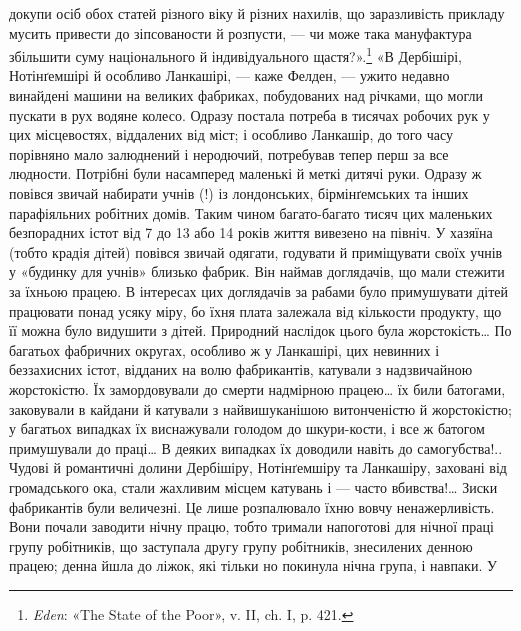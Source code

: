 \parcont{}  %
докупи осіб обох статей різного віку й різних нахилів, що заразливість прикладу
мусить привести до зіпсованости й розпусти, — чи може така мануфактура збільшити
суму національного й індивідуального щастя?».\footnote{
\emph{Eden}: «The State of the Poor», v. II, ch. I, p. 421.
} «В Дербішірі, Нотінґемшірі й особливо
Ланкашірі, — каже Фелден, — ужито недавно винайдені машини на великих фабриках,
побудованих над річками, що могли пускати в рух водяне колесо. Одразу постала
потреба в тисячах робочих рук у цих місцевостях, віддалених від міст; і особливо
Ланкашір, до того часу порівняно мало залюднений і неродючий, потребував тепер
перш за все людности. Потрібні були насамперед маленькі й меткі дитячі руки.
Одразу ж повівся звичай набирати учнів (!) із лондонських, бірмінґемських та
інших парафіяльних робітних домів. Таким чином багато-багато тисяч
цих маленьких безпорадних істот від 7 до 13 або 14 років життя вивезено на
північ. У хазяїна (тобто крадія дітей) повівся звичай одягати, годувати й
приміщувати своїх учнів у «будинку для учнів» близько фабрик. Він наймав
доглядачів, що мали стежити за їхньою працею. В інтересах цих доглядачів
за рабами було примушувати дітей працювати понад усяку міру, бо їхня плата
залежала від кількости продукту, що її можна було видушити
з дітей. Природний наслідок цього була жорстокість\dots{} По багатьох фабричних
округах, особливо ж у Ланкашірі, цих невинних і беззахисних істот, відданих на
волю фабрикантів, катували з надзвичайною жорстокістю. Їх замордовували до
смерти надмірною працею\dots{} їх били батогами, заковували в кайдани й
катували з найвишуканішою витонченістю й жорстокістю; у багатьох випадках їх
виснажували голодом до шкури-кости, і все ж батогом примушували до праці\dots{}
В деяких випадках їх доводили навіть до самогубства!.. Чудові й романтичні
долини Дербішіру, Нотінґемшіру та Ланкашіру, заховані від
громадського ока, стали жахливим місцем катувань і — часто вбивства!\dots{}
Зиски фабрикантів були величезні. Це лише розпалювало їхню вовчу ненажерливість.
Вони почали заводити нічну працю, тобто тримали напоготові для нічної праці
групу робітників, що заступала другу групу робітників, знесилених денною працею;
денна йшла до ліжок, які тільки но покинула нічна група, і навпаки. У
